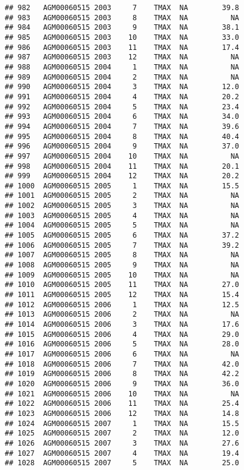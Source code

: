 \documentclass{article}\usepackage[]{graphicx}\usepackage[]{color}
\makeatletter
\newenvironment{kframe}{%
 \def\at@end@of@kframe{}%
 \ifinner\ifhmode%
  \def\at@end@of@kframe{\end{minipage}}%
  \begin{minipage}{\columnwidth}%
 \fi\fi%
 \def\FrameCommand##1{\hskip\@totalleftmargin \hskip-\fboxsep
 \colorbox{shadecolor}{##1}\hskip-\fboxsep
     \hskip-\linewidth \hskip-\@totalleftmargin \hskip\columnwidth}%
 \MakeFramed {\advance\hsize-\width
   \@totalleftmargin\z@ \linewidth\hsize
   \@setminipage}}%
 {\par\unskip\endMakeFramed%
 \at@end@of@kframe}
\newenvironment{knitrout}{}{} %
\makeatother
\begin{document}
\begin{knitrout}
\begin{kframe}
\begin{verbatim}
## 982   AGM00060515 2003     7    TMAX  NA        39.8
## 983   AGM00060515 2003     8    TMAX  NA          NA
## 984   AGM00060515 2003     9    TMAX  NA        38.1
## 985   AGM00060515 2003    10    TMAX  NA        33.0
## 986   AGM00060515 2003    11    TMAX  NA        17.4
## 987   AGM00060515 2003    12    TMAX  NA          NA
## 988   AGM00060515 2004     1    TMAX  NA          NA
## 989   AGM00060515 2004     2    TMAX  NA          NA
## 990   AGM00060515 2004     3    TMAX  NA        12.0
## 991   AGM00060515 2004     4    TMAX  NA        20.2
## 992   AGM00060515 2004     5    TMAX  NA        23.4
## 993   AGM00060515 2004     6    TMAX  NA        34.0
## 994   AGM00060515 2004     7    TMAX  NA        39.6
## 995   AGM00060515 2004     8    TMAX  NA        40.4
## 996   AGM00060515 2004     9    TMAX  NA        37.0
## 997   AGM00060515 2004    10    TMAX  NA          NA
## 998   AGM00060515 2004    11    TMAX  NA        20.1
## 999   AGM00060515 2004    12    TMAX  NA        20.2
## 1000  AGM00060515 2005     1    TMAX  NA        15.5
## 1001  AGM00060515 2005     2    TMAX  NA          NA
## 1002  AGM00060515 2005     3    TMAX  NA          NA
## 1003  AGM00060515 2005     4    TMAX  NA          NA
## 1004  AGM00060515 2005     5    TMAX  NA          NA
## 1005  AGM00060515 2005     6    TMAX  NA        37.2
## 1006  AGM00060515 2005     7    TMAX  NA        39.2
## 1007  AGM00060515 2005     8    TMAX  NA          NA
## 1008  AGM00060515 2005     9    TMAX  NA          NA
## 1009  AGM00060515 2005    10    TMAX  NA          NA
## 1010  AGM00060515 2005    11    TMAX  NA        27.0
## 1011  AGM00060515 2005    12    TMAX  NA        15.4
## 1012  AGM00060515 2006     1    TMAX  NA        12.5
## 1013  AGM00060515 2006     2    TMAX  NA          NA
## 1014  AGM00060515 2006     3    TMAX  NA        17.6
## 1015  AGM00060515 2006     4    TMAX  NA        29.0
## 1016  AGM00060515 2006     5    TMAX  NA        28.0
## 1017  AGM00060515 2006     6    TMAX  NA          NA
## 1018  AGM00060515 2006     7    TMAX  NA        42.0
## 1019  AGM00060515 2006     8    TMAX  NA        42.2
## 1020  AGM00060515 2006     9    TMAX  NA        36.0
## 1021  AGM00060515 2006    10    TMAX  NA          NA
## 1022  AGM00060515 2006    11    TMAX  NA        25.4
## 1023  AGM00060515 2006    12    TMAX  NA        14.8
## 1024  AGM00060515 2007     1    TMAX  NA        15.5
## 1025  AGM00060515 2007     2    TMAX  NA        12.0
## 1026  AGM00060515 2007     3    TMAX  NA        27.6
## 1027  AGM00060515 2007     4    TMAX  NA        19.4
## 1028  AGM00060515 2007     5    TMAX  NA        25.0

\end{verbatim}
\end{kframe}
\end{knitrout}
\end{document}

